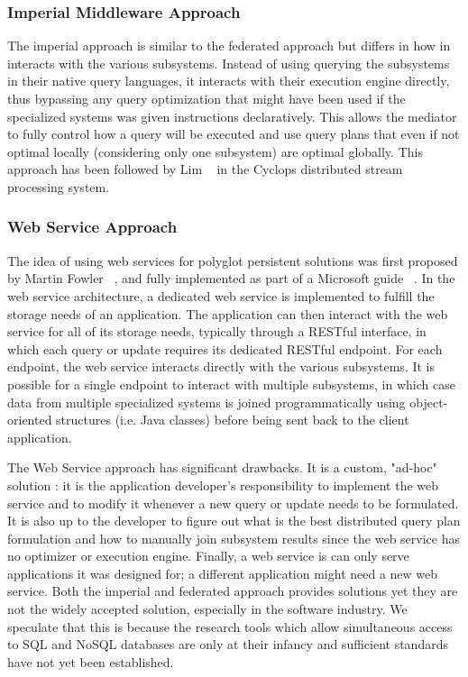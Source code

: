 
\subsubsection{Imperial Middleware Approach}

The imperial approach is similar to the federated approach but differs in how in interacts with the various subsystems. Instead of using querying the subsystems in their native query languages, it interacts with their execution engine directly, thus bypassing any query optimization that might have been used if the specialized systems was given instructions declaratively. This allows the mediator to fully control how a query will be executed and use query plans that even if not optimal locally (considering only one subsystem) are optimal globally. This approach has been followed by Lim ~\cite{Lim2013} in the Cyclops distributed stream processing system.

\subsubsection{Web Service Approach}

The idea of using web services for polyglot persistent solutions was first proposed by Martin Fowler ~\cite{Fowler2012}, and fully implemented as part of a Microsoft guide ~\cite{Sharp2013}. In the web service architecture, a dedicated web service is implemented to fulfill the storage needs of an application.  The application can then interact with the web service for all of its storage needs, typically through a RESTful interface, in which each query or update requires its dedicated RESTful endpoint. For each endpoint, the web service interacts directly with the various subsystems. It is possible for a single endpoint to interact with multiple subsystems, in which case data from multiple specialized systems is joined programmatically using object-oriented structures (i.e. Java classes) before being sent back to the client application.

The Web Service approach has significant drawbacks. It is a custom, "ad-hoc" solution : it is the application developer's responsibility to implement  the web service and to modify it whenever a new query or update needs to be formulated. It is also up to the developer to figure out what is the best distributed query plan formulation and how to manually join subsystem results since the web service has no optimizer or execution engine. Finally, a web service is can only serve applications it was designed for; a different application might need a new web service. Both the imperial and federated approach provides solutions yet they are not the widely accepted solution, especially in the software industry. We speculate that this is because the research tools which allow simultaneous access to SQL and NoSQL databases are only at their infancy and sufficient standards have not yet been established.

